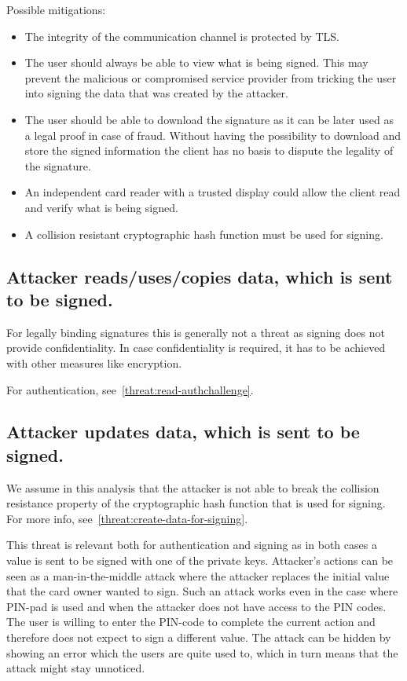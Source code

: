 Possible mitigations:
\begin{itemize}
\item The integrity of the communication channel is protected by TLS.

\item The user should always be able to view what is being signed. This may prevent the malicious or compromised service provider from tricking the user into signing the data that was created by the attacker. 

\item The user should be able to download the signature as it can be later used as a legal proof in case of fraud. Without having the possibility to download and store the signed information the client has no basis to dispute the legality of the signature. 

\item An independent card reader with a trusted display could allow the client read and verify what is being signed.

\item A collision resistant cryptographic hash function must be used for signing.
\end{itemize}


\subsection{Attacker reads/uses/copies data, which is sent to be signed.}
\label{threat:read-data-for-signing}
For legally binding signatures this is generally not a threat as signing does not provide confidentiality. In case confidentiality is required, it has to be achieved with other measures like encryption.

For authentication, see~\ref{threat:read-authchallenge}. 


\subsection{Attacker updates data, which is sent to be signed.}
\label{threat:update-data-for-signing}
We assume in this analysis that the attacker is not able to break the collision resistance property of the cryptographic hash function that is used for signing. For more info, see~\ref{threat:create-data-for-signing}.

This threat is relevant both for authentication and signing as in both cases a value is sent to be signed with one of the private keys. Attacker's actions can be seen as a man-in-the-middle attack where the attacker replaces the initial value that the card owner wanted to sign. Such an attack works even in the case where PIN-pad is used and when the attacker does not have access to the PIN codes. The user is willing to enter the PIN-code to complete the current action and therefore does not expect to sign a different value. The attack can be hidden by showing an error which the users are quite used to, which in turn means that the attack might stay unnoticed.

